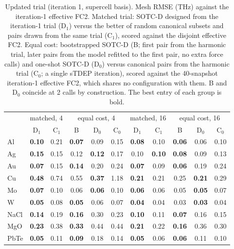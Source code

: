 \begin{table}[t]
\caption{Updated trial (iteration 1, supercell basis). Mesh RMSE (THz) against the iteration-1 effective FC2. Matched trial: SOTC-D designed from the iteration-1 trial (D$_1$) versus the better of random canonical subsets and pairs drawn from the same trial (C$_1$), scored against the disjoint effective FC2. Equal cost: bootstrapped SOTC-D (B; first pair from the harmonic trial, later pairs from the model refitted to the first pair, no extra force calls) and one-shot SOTC-D (D$_0$) versus canonical pairs from the harmonic trial (C$_0$; a single sTDEP iteration), scored against the 40-snapshot iteration-1 effective FC2, which shares no configuration with them. B and D$_0$ coincide at 2 calls by construction. The best entry of each group is bold.}
\label{tab:selfconsistent_4_16}
\begin{ruledtabular}
\begin{tabular}{lcccccccccc}
 & \multicolumn{2}{c}{matched, 4} & \multicolumn{3}{c}{equal cost, 4} & \multicolumn{2}{c}{matched, 16} & \multicolumn{3}{c}{equal cost, 16}\\
 & D$_1$ & C$_1$ & B & D$_0$ & C$_0$ & D$_1$ & C$_1$ & B & D$_0$ & C$_0$\\
\hline
Al & \textbf{0.10} & 0.21 & \textbf{0.07} & 0.09 & 0.15 & \textbf{0.08} & 0.10 & \textbf{0.06} & 0.06 & 0.10\\
Ag & \textbf{0.15} & 0.15 & 0.12 & \textbf{0.12} & 0.17 & 0.10 & \textbf{0.10} & \textbf{0.08} & 0.09 & 0.13\\
Au & \textbf{0.07} & 0.15 & \textbf{0.14} & 0.20 & 0.24 & \textbf{0.07} & 0.09 & \textbf{0.06} & 0.19 & 0.24\\
Cu & \textbf{0.48} & 0.74 & 0.55 & \textbf{0.37} & 1.18 & \textbf{0.21} & 0.21 & 0.25 & \textbf{0.21} & 0.29\\
Mo & \textbf{0.07} & 0.10 & 0.06 & \textbf{0.06} & 0.10 & \textbf{0.06} & 0.06 & 0.05 & \textbf{0.05} & 0.07\\
W & \textbf{0.05} & 0.08 & \textbf{0.05} & 0.06 & 0.07 & \textbf{0.04} & 0.04 & 0.03 & \textbf{0.03} & 0.04\\
NaCl & \textbf{0.14} & 0.19 & \textbf{0.16} & 0.30 & 0.23 & \textbf{0.10} & 0.11 & \textbf{0.07} & 0.16 & 0.15\\
MgO & \textbf{0.23} & 0.38 & \textbf{0.33} & 0.44 & 0.44 & \textbf{0.21} & 0.22 & \textbf{0.16} & 0.36 & 0.30\\
PbTe & \textbf{0.05} & 0.11 & \textbf{0.09} & 0.18 & 0.14 & \textbf{0.05} & 0.06 & \textbf{0.06} & 0.11 & 0.10\\

\end{tabular}
\end{ruledtabular}
\end{table}
